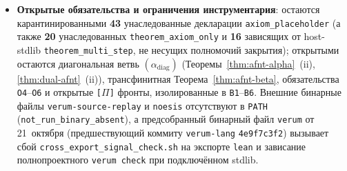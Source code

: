 \documentclass[11pt]{article}
\theoremstyle{plain}
\theoremstyle{definition}
\begin{document}
\begin{itemize}[nosep]
\item \textbf{Открытые обязательства и ограничения инструментария}: остаются карантинированными \textbf{43} унаследованные декларации \texttt{axiom\_placeholder} (а также \textbf{20} унаследованных \texttt{theorem\_axiom\_only} и \textbf{16} зависящих от host-stdlib \texttt{theorem\_multi\_step}, не несущих полномочий закрытия); открытыми остаются диагональная ветвь $(\alpha_{\mathrm{diag}})$ (Теоремы~\ref{thm:afnt-alpha}~(ii), \ref{thm:dual-afnt}~(ii)), трансфинитная Теорема~\ref{thm:afnt-beta}, обязательства \texttt{O4}--\texttt{O6} и открытые \texttt{[\textbf{$\Pi$}]} фронты, изолированные в \texttt{B1}--\texttt{B6}. Внешние бинарные файлы \texttt{verum-source-replay} и \texttt{noesis} отсутствуют в \texttt{PATH} (\texttt{not\_run\_binary\_absent}), а предсобранный бинарный файл \texttt{verum} от 21~октября (предшествующий коммиту \texttt{verum-lang} \texttt{4e9f7c3f2}) вызывает сбой \texttt{cross\_export\_signal\_check.sh} на экспорте \texttt{lean} и зависание полнопроектного \texttt{verum check} при подключённом stdlib.
\end{itemize}
\end{document}
